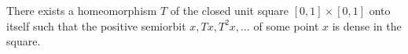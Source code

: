 There exists a homeomorphism $T$ of the closed unit square $[0,1] \times [0,1]$ onto itself such that the positive semiorbit $x, Tx, T^2x, \ldots$ of some point $x$ is dense in the square.
